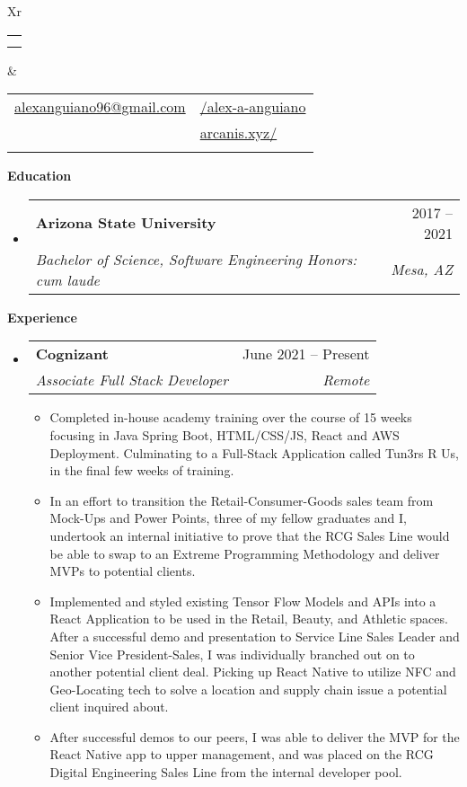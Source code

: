 \documentclass[letterpaper,12pt]{article}[leftmargin=*]
\makeatletter
\def \fullname {Alex Anguiano}
\def \subtitle {}
\def \linkedinicon {\faLinkedin}
\def \linkedinlink {https://www.linkedin.com/in/alex-a-anguiano/}
\def \linkedintext {/alex-a-anguiano}
\def \phoneicon {\faPhone}
\def \phonetext {+1-480-335-2816}
\def \emailicon {\faEnvelope}
\def \emaillink {mailto:alexanguiano96@gmail.com}
\def \emailtext {alexanguiano96@gmail.com}
\def \websiteicon {\faGlobe}
\def \websitelink {http://arcanis.xyz/}
\def \websitetext {arcanis.xyz/}
\def \headertype {\doublecol} %
\def \entryspacing {-0pt}
\def \linkedin {\linkedinicon \hspace{3pt}\href{\linkedinlink}{\linkedintext}}
\def \phone {\phoneicon \hspace{3pt}{ \phonetext}}
\def \email {\emailicon \hspace{3pt}\href{\emaillink}{\emailtext}}
\def \website {\websiteicon \hspace{3pt}\href{\websitelink}{\websitetext}}
\renewcommand{\section}[2]{\vspace{5pt}
  \colorbox{secondary}{\color{white}\raggedbottom\normalsize\textbf{{#1}{\hspace{7pt}#2}}}
}
\newcommand{\resumeEntryStart}{\begin{itemize}[leftmargin=2.5mm]}
\newcommand{\resumeEntryEnd}{\end{itemize}\vspace{\entryspacing}}
\newcommand{\resumeItemListStart}{\begin{itemize}[leftmargin=4.5mm]}
\newcommand{\resumeItemListEnd}{\end{itemize}}
\newcommand{\resumeItem}[1]{
  \item\small{
    {#1 \vspace{-2pt}}
  }
}
\newcommand{\resumeEntryTSDL}[4]{
  \vspace{-1pt}\item[]
    \begin{tabularx}{0.97\textwidth}{X@{\hspace{60pt}}r}
      \textbf{\color{primary}#1} & {\firabook\color{accent}\small#2} \\
      \textit{\color{accent}\small#3} & \textit{\color{accent}\small#4} \\
    \end{tabularx}\vspace{-6pt}
}
\newcommand{\doublecol}[6]{
  \begin{tabularx}{\textwidth}{Xr}
    {
      \begin{tabular}[c]{l}
        \fontsize{35}{45}\selectfont{\color{primary}{{\textbf{\fullname}}}} \\
        {\textit{\subtitle}} %
      \end{tabular}
    } & {
      \begin{tabular}[c]{l@{\hspace{1.5em}}l}
        {\small#4} & {\small#1} \\
        {\small#5} & {\small#2} \\
        {\small#6} & {\small#3}
      \end{tabular}
    }
  \end{tabularx}
}
\newcommand{\singlecol}[6]{
  \begin{tabularx}{\textwidth}{Xr}
    {
      \begin{tabular}[b]{l}
        \fontsize{35}{45}\selectfont{\color{primary}{{\textbf{\fullname}}}} \\
        {\textit{\subtitle}} %
      \end{tabular}
    } & {
      \begin{tabular}[c]{l}
        {\small#1} \\
        {\small#2} \\
        {\small#3} \\
        {\small#4} \\
        {\small#5} \\
        {\small#6}
      \end{tabular}
    }
  \end{tabularx}
}
\makeatother
\begin{document}


\headertype{\linkedin}{\website}{\phone}{\email}{}{} %
\vspace{-10pt} %

\section{\faGraduationCap}{Education}

  \resumeEntryStart
    \resumeEntryTSDL
      {Arizona State University}{2017 -- 2021}
      {Bachelor of Science, Software Engineering \quad Honors: cum laude }{Mesa, AZ}
  \resumeEntryEnd
  
\section{\faPieChart}{Experience}

  \resumeEntryStart
    \resumeEntryTSDL
      {Cognizant}{June 2021 -- Present}
      {Associate Full Stack Developer}{Remote}
    \resumeItemListStart
      \resumeItem {Completed in-house academy training over the course of 15 weeks focusing in Java Spring Boot, HTML/CSS/JS, React and AWS Deployment. Culminating to a Full-Stack Application called Tun3rs R Us, in the final few weeks of training.}
      \resumeItem {In an effort to transition the Retail-Consumer-Goods sales team from Mock-Ups and Power Points, three of my fellow graduates and I, undertook an internal initiative to prove that the RCG Sales Line would be able to swap to an Extreme Programming Methodology and deliver MVPs to potential clients.}
      \resumeItem {Implemented and styled existing Tensor Flow Models and APIs into a React Application to be used in the Retail, Beauty, and Athletic spaces. After a successful demo and presentation to Service Line Sales Leader and Senior Vice President-Sales, I was individually branched out on to another potential client deal. Picking up React Native to utilize NFC and Geo-Locating tech to solve a location and supply chain issue a potential client inquired about.}
      \resumeItem {After successful demos to our peers, I was able to deliver the MVP for the React Native app to upper management, and was placed on the RCG Digital Engineering Sales Line from the internal developer pool.}
    \resumeItemListEnd
  \resumeEntryEnd
  
\end{document}
